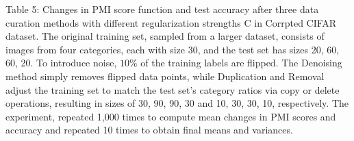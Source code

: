 Table 5: Changes in PMI score function and test accuracy after three
data curation methods with different regularization strengths C in
Corrpted CIFAR dataset. The original training set, sampled from a larger
dataset, consists of images from four categories, each with size 30, and
the test set has sizes 20, 60, 60, 20. To introduce noise, \(1 0 \%\) of
the training labels are flipped. The Denoising method simply removes
flipped data points, while Duplication and Removal adjust the training
set to match the test set's category ratios via copy or delete
operations, resulting in sizes of 30, 90, 90, 30 and 10, 30, 30, 10,
respectively. The experiment, repeated 1,000 times to compute mean
changes in PMI scores and accuracy and repeated 10 times to obtain final
means and variances.


